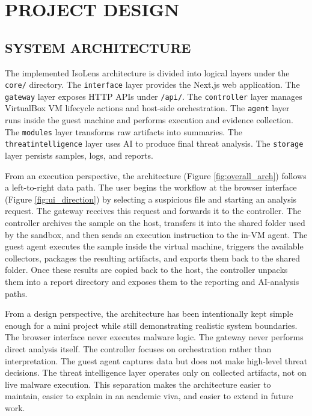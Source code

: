 \documentclass[a4paper,12pt,oneside]{report}
\begin{document}
\chapter{PROJECT DESIGN}
\section{SYSTEM ARCHITECTURE}
The implemented IsoLens architecture is divided into logical layers under the \texttt{core/} directory. The \texttt{interface} layer provides the Next.js web application. The \texttt{gateway} layer exposes HTTP APIs under \texttt{/api/}. The \texttt{controller} layer manages VirtualBox VM lifecycle actions and host-side orchestration. The \texttt{agent} layer runs inside the guest machine and performs execution and evidence collection. The \texttt{modules} layer transforms raw artifacts into summaries. The \texttt{threatintelligence} layer uses AI to produce final threat analysis. The \texttt{storage} layer persists samples, logs, and reports.

\par

\par

From an execution perspective, the architecture (Figure \ref{fig:overall_arch}) follows a left-to-right data path. The user begins the workflow at the browser interface (Figure \ref{fig:ui_direction}) by selecting a suspicious file and starting an analysis request. The gateway receives this request and forwards it to the controller. The controller archives the sample on the host, transfers it into the shared folder used by the sandbox, and then sends an execution instruction to the in-VM agent. The guest agent executes the sample inside the virtual machine, triggers the available collectors, packages the resulting artifacts, and exports them back to the shared folder. Once these results are copied back to the host, the controller unpacks them into a report directory and exposes them to the reporting and AI-analysis paths.

\par

\par

From a design perspective, the architecture has been intentionally kept simple enough for a mini project while still demonstrating realistic system boundaries. The browser interface never executes malware logic. The gateway never performs direct analysis itself. The controller focuses on orchestration rather than interpretation. The guest agent captures data but does not make high-level threat decisions. The threat intelligence layer operates only on collected artifacts, not on live malware execution. This separation makes the architecture easier to maintain, easier to explain in an academic viva, and easier to extend in future work.
\end{document}
